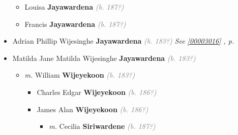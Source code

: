 \documentclass[10pt, openany]{book}
\begin{document}
\begin{itemize}
{\begin{itemize}
{\begin{itemize}
{\begin{itemize}
{\begin{itemize}
{\begin{itemize}
{\begin{itemize}
{\begin{itemize}
{\begin{itemize}
\item{Kiandra  \textbf{Benjamin} \textcolor{gray}{\textit{(b. 200?)}}
 }
\item{Aaron  \textbf{Benjamin} \textcolor{gray}{\textit{(b. 201?)}}
 }
\item{Kiara  \textbf{Benjamin} \textcolor{gray}{\textit{(b. 201?)}}
 }
\item{Kendrik  \textbf{Benjamin} \textcolor{gray}{\textit{(b. 201?)}}
 }
\end{itemize}}
\end{itemize}
 }
\end{itemize}}
\end{itemize}
 }
\end{itemize}}
\end{itemize}
 }
\end{itemize}
 }
\item{Louisa \textbf{Jayawardena} \textcolor{gray}{\textit{(b. 187?)}}
 }
\item{Francis \textbf{Jayawardena} \textcolor{gray}{\textit{(b. 187?)}}
 }
\end{itemize}
   }
\item{Adrian Phillip Wijesinghe \textbf{Jayawardena} \textcolor{gray}{\textit{(b. 183?)}} \textcolor{slteal}{\textit{See  \autoref{00003016} \textit{, p. \pageref{00003016} }}}}
\item{Matilda Jane Matilda Wijesinghe \textbf{Jayawardena} \textcolor{gray}{\textit{(b. 183?)}}
\begin{itemize}
\item{\textit{m.} William \textbf{Wijeyekoon} \textcolor{gray}{\textit{(b. 183?)}}   \label{couple:00003192:00003193} \begin{itemize}
\item{Charles Edgar  \textbf{Wijeyekoon} \textcolor{gray}{\textit{(b. 186?)}}
  }
\item{James Alan  \textbf{Wijeyekoon} \textcolor{gray}{\textit{(b. 186?)}}
\begin{itemize}
\item{\textit{m.} Cecilia \textbf{Siriwardene} \textcolor{gray}{\textit{(b. 187?)}}   \label{couple:00003198:00003199} \begin{itemize}

\end{itemize}}
\end{itemize}}
\end{itemize}}
\end{itemize}}
\end{itemize}
\end{document}
